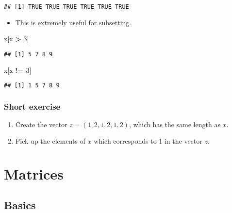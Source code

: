 \documentclass[]{book}
\newenvironment{Shaded}{\begin{snugshade}}{\end{snugshade}}
\newcommand{\DecValTok}[1]{\textcolor[rgb]{0.00,0.00,0.81}{#1}}
\newcommand{\StringTok}[1]{\textcolor[rgb]{0.31,0.60,0.02}{#1}}
\newcommand{\OperatorTok}[1]{\textcolor[rgb]{0.81,0.36,0.00}{\textbf{#1}}}
\newcommand{\NormalTok}[1]{#1}
\providecommand{\tightlist}{%
  \setlength{\itemsep}{0pt}\setlength{\parskip}{0pt}}
\begin{document}
\begin{verbatim}
## [1] TRUE TRUE TRUE TRUE TRUE TRUE
\end{verbatim}

\begin{itemize}
\tightlist
\item
  This is extremely useful for subsetting.
\end{itemize}

\begin{Shaded}
\begin{Highlighting}[]
\NormalTok{x[x }\OperatorTok{>}\StringTok{ }\DecValTok{3}\NormalTok{]}
\end{Highlighting}
\end{Shaded}

\begin{verbatim}
## [1] 5 7 8 9
\end{verbatim}

\begin{Shaded}
\begin{Highlighting}[]
\NormalTok{x[x }\OperatorTok{!=}\StringTok{ }\DecValTok{3}\NormalTok{]}
\end{Highlighting}
\end{Shaded}

\begin{verbatim}
## [1] 1 5 7 8 9
\end{verbatim}

\subsubsection{Short exercise}\label{short-exercise}

\begin{enumerate}
\def\labelenumi{\arabic{enumi}.}
\tightlist
\item
  Create the vector \(z = (1,2,1,2,1,2)\), which has the same length as
  \(x\).
\item
  Pick up the elements of \(x\) which corresponds to 1 in the vector
  \(z\).
\end{enumerate}

\section{Matrices}\label{matrices}

\subsection{Basics}\label{basics}
\end{document}
